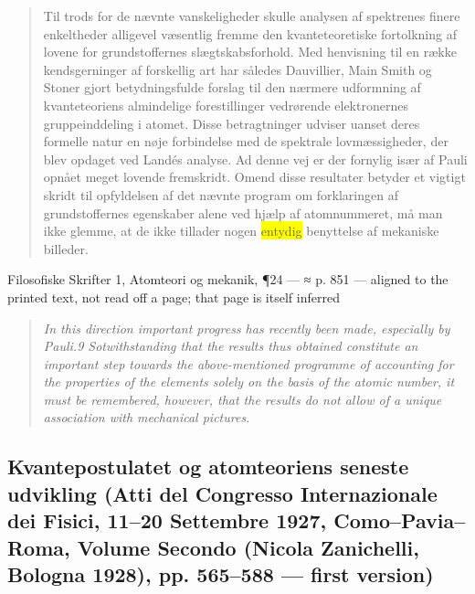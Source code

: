 \documentclass[11pt]{article}
\newcommand{\dcite}[1]{{\nopagebreak\raggedleft\small #1\par}\medskip}
\newcommand{\tlg}[1]{{\setlength{\fboxsep}{0.8pt}\colorbox{yellow}{#1}}}
\newcommand{\olg}[1]{{\setlength{\fboxsep}{0.8pt}\colorbox{cyan!25}{#1}}}
\begin{document}
\begin{quote}
Til trods for de nævnte vanskeligheder skulle analysen af spektrenes finere enkeltheder alligevel væsentlig fremme den kvanteteoretiske fortolkning af lovene for grundstoffernes slægtskabsforhold. Med henvisning til en række kendsgerninger af forskellig art har således Dauvillier, Main Smith og Stoner gjort betydningsfulde forslag til den nærmere udformning af kvanteteoriens almindelige forestillinger vedrørende elektronernes gruppeinddeling i atomet. Disse betragtninger udviser uanset deres formelle natur en nøje forbindelse med de spektrale lovmæssigheder, der blev opdaget ved Landés analyse. Ad denne vej er der fornylig især af Pauli opnået meget lovende fremskridt. Omend disse resultater betyder et vigtigt skridt til opfyldelsen af det nævnte program om forklaringen af grundstoffernes egenskaber alene ved hjælp af atomnummeret, må man ikke glemme, at de ikke tillader nogen \tlg{entydig} benyttelse af mekaniske billeder.
\end{quote}
\dcite{Filosofiske Skrifter 1, Atomteori og mekanik, ¶24 — ≈ p. 851 — aligned to the printed text, not read off a page; that page is itself inferred}
{\footnotesize\begin{quote}\itshape
In this direction important progress has recently been made, especially by Pauli.9 Sotwithstanding that the results thus obtained constitute an important step towards the above-mentioned programme of accounting for the properties of the elements solely on the basis of the atomic number, it must be remembered, however, that the results do not allow of a \olg{unique} association with mechanical pictures.
\end{quote}}

\subsection{Kvantepostulatet og atomteoriens seneste udvikling \normalfont(Atti del Congresso Internazionale dei Fisici, 11–20 Settembre 1927, Como–Pavia–Roma, Volume Secondo (Nicola Zanichelli, Bologna 1928), pp. 565–588 — first version)}
\end{document}

